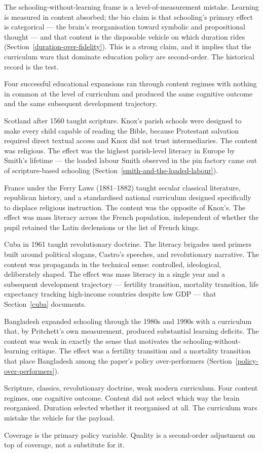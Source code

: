 \documentclass[12pt,letterpaper]{article}
\begin{document}
{The schooling-without-learning frame is a level-of-measurement mistake. Learning is measured in content absorbed; the bio claim is that schooling's primary effect is categorical --- the brain's reorganisation toward symbolic and propositional thought --- and that content is the disposable vehicle on which duration rides (Section~\ref{duration-over-fidelity}). This is a strong claim, and it implies that the curriculum wars that dominate education policy are second-order. The historical record is the test.

Four successful educational expansions ran through content regimes with nothing in common at the level of curriculum and produced the same cognitive outcome and the same subsequent development trajectory.

Scotland after 1560 taught scripture. Knox's parish schools were designed to make every child capable of reading the Bible, because Protestant salvation required direct textual access and Knox did not trust intermediaries. The content was religious. The effect was the highest parish-level literacy in Europe by Smith's lifetime --- the loaded labour Smith observed in the pin factory came out of scripture-based schooling (Section~\ref{smith-and-the-loaded-labour}).

France under the Ferry Laws (1881--1882) taught secular classical literature, republican history, and a standardised national curriculum designed specifically to displace religious instruction. The content was the opposite of Knox's. The effect was mass literacy across the French population, independent of whether the pupil retained the Latin declensions or the list of French kings.

Cuba in 1961 taught revolutionary doctrine. The literacy brigades used primers built around political slogans, Castro's speeches, and revolutionary narrative. The content was propaganda in the technical sense: controlled, ideological, deliberately shaped. The effect was mass literacy in a single year and a subsequent development trajectory --- fertility transition, mortality transition, life expectancy tracking high-income countries despite low GDP --- that Section~\ref{cuba} documents.

Bangladesh expanded schooling through the 1980s and 1990s with a curriculum that, by Pritchett's own measurement, produced substantial learning deficits. The content was weak in exactly the sense that motivates the schooling-without-learning critique. The effect was a fertility transition and a mortality transition that place Bangladesh among the paper's policy over-performers (Section~\ref{policy-over-performers}).

Scripture, classics, revolutionary doctrine, weak modern curriculum. Four content regimes, one cognitive outcome. Content did not select which way the brain reorganised. Duration selected whether it reorganised at all. The curriculum wars mistake the vehicle for the payload.

Coverage is the primary policy variable. Quality is a second-order adjustment on top of coverage, not a substitute for it.

}
\end{document}
